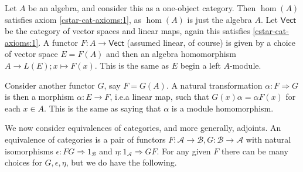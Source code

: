 \documentclass[a4paper,11pt]{article}
\theoremstyle{plain}
\theoremstyle{remark}
\newenvironment{example}
  {\pushQED{\qed}\renewcommand{\qedsymbol}{$\triangle$}\examplex}
  {\popQED\endexamplex}
\newcommand{\mc}[1]{\mathcal{#1}}
\newcommand{\catVect}{\textsf{Vect}}
\begin{document}
\begin{example}
Let $A$ be an algebra, and consider this as a one-object category.  Then $\hom(A)$ satisfies axiom \ref{cstar-cat-axioms:1}, as $\hom(A)$ is just the algebra $A$.  Let $\catVect$ be the category of vector spaces and linear maps, again this satisfies \ref{cstar-cat-axioms:1}.  A functor $F\colon A \to \catVect$ (assumed linear, of course) is given by a choice of vector space $E = F(A)$ and then an algebra homomorphism $A \to L(E); x \mapsto F(x)$.  This is the same as $E$ begin a left $A$-module.

Consider another functor $G$, say $F = G(A)$.  A natural transformation $\alpha \colon F \Rightarrow G$ is then a morphism $\alpha \colon E \to F$, i.e.\@ a linear map, such that $G(x)\alpha = \alpha F(x)$ for each $x\in A$.  This is the same as saying that $\alpha$ is a module homomorphism.
\end{example}

We now consider equivalences of categories, and more generally, adjoints.  An equivalence of categories is a pair of functors $F\colon\mc A\to\mc B, G \colon \mc B \to \mc A$ with natural isomorphisms $\epsilon \colon FG \Rightarrow 1_{\mc B}$ and $\eta \colon 1_{\mc A} \Rightarrow GF$.  For any given $F$ there can be many choices for $G,\epsilon,\eta$, but we do have the following.
\end{document}
